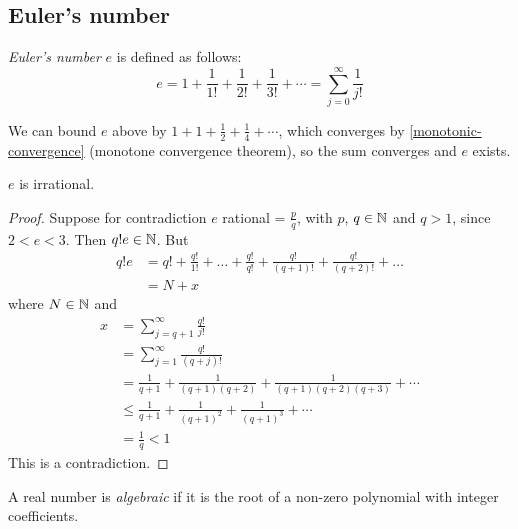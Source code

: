 \documentclass{../template/note}
\begin{document}
    \subsection{Euler's number}
    
    \begin{definition}
        \emph{Euler's number} \(e\) is defined as follows:
        \[
            e = 1 + \frac{1}{1!} + \frac{1}{2!} + \frac{1}{3!} + \cdots = \sum_{j=0}^\infty \frac{1}{j!}
        \]
    \end{definition}
    
    \begin{remark*}
        We can bound \(e\) above by \(1 + 1 + \frac{1}{2} + \frac{1}{4} + \cdots\), which converges by \cref{monotonic-convergence} (monotone convergence theorem), so the sum converges and \(e\) exists.
    \end{remark*}
    
    \begin{proposition}
        \(e\) is irrational.
    \end{proposition}
    
    \begin{proof}
        Suppose for contradiction \(e\) rational = \(\frac{p}{q}\), with \(p\), \(q \in \mathbb N\) and \(q > 1\), since \(2 < e < 3\). Then \(q!e \in \mathbb N\). But
        \begin{align*}
            q!e &= q! + \frac{q!}{1!} + \dots + \frac{q!}{q!} + \frac{q!}{(q+1)!} + \frac{q!}{(q+2)!} + \dots \\ 
            &= N + x
        \end{align*}
        where \(N \in \mathbb N\) and
        \begin{align*}
            x &= \sum_{j=q+1}^\infty \frac{q!}{j!} \\
            &= \sum_{j=1}^\infty \frac{q!}{(q+j)!} \\
            &= \frac{1}{q+1} + \frac{1}{(q+1)(q+2)} + \frac{1}{(q+1)(q+2)(q+3)} + \cdots \\
            &\leq \frac{1}{q+1} + \frac{1}{(q+1)^2} + \frac{1}{(q+1)^3} + \cdots \\
            &= \frac{1}{q} < 1
        \end{align*}
        This is a contradiction.
    \end{proof}
    
    \begin{definition}
        A real number is \emph{algebraic} if it is the root of a non-zero polynomial with integer coefficients.
    \end{definition}
    
\end{document}
